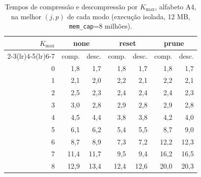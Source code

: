 \begin{table}[H]
\centering
\small
\caption{Tempos de compress\~ao e descompress\~ao por $K_{\max}$, alfabeto A4, na melhor $(j,p)$ de cada modo (execu\c{c}\~ao isolada, 12 MB, \texttt{mem\_cap}=8 milh\~oes).}
\label{tab:times-A4}
\begin{tabular}{rrrrrrr}
\toprule
$K_{\max}$ & \multicolumn{2}{c}{none} & \multicolumn{2}{c}{reset} & \multicolumn{2}{c}{prune} \\
\cmidrule(lr){2-3}\cmidrule(lr){4-5}\cmidrule(lr){6-7}
 & comp. & desc. & comp. & desc. & comp. & desc. \\
\midrule
0 & 1,8 & 1,7 & 1,8 & 1,7 & 1,8 & 1,7 \\
1 & 2,1 & 2,0 & 2,2 & 2,1 & 2,2 & 2,1 \\
2 & 2,5 & 2,3 & 2,4 & 2,4 & 2,4 & 2,3 \\
3 & 3,0 & 2,8 & 2,9 & 2,8 & 2,9 & 2,8 \\
4 & 4,5 & 4,4 & 3,8 & 3,8 & 4,2 & 4,0 \\
5 & 6,1 & 6,2 & 5,4 & 5,5 & 8,7 & 9,0 \\
6 & 8,7 & 8,9 & 7,3 & 7,2 & 12,2 & 12,3 \\
7 & 11,4 & 11,7 & 9,5 & 9,4 & 16,2 & 16,5 \\
8 & 12,9 & 13,4 & 12,4 & 12,6 & 20,0 & 20,3 \\
\bottomrule
\end{tabular}
\end{table}
